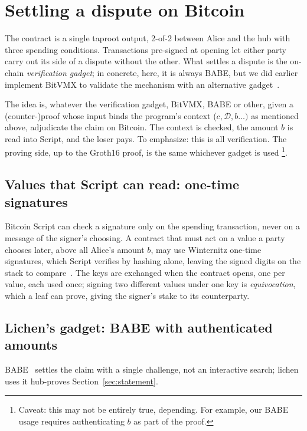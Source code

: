 \documentclass[11pt]{article}
\begin{document}
\section{Settling a dispute on Bitcoin}
\label{sec:blocks}

The contract is a single taproot output, 2-of-2 between Alice and the
hub with three spending conditions. Transactions pre-signed at
opening let either party carry out its side of a dispute without the
other. What settles a dispute is the on-chain \emph{verification gadget}; in concrete, here, it is always BABE, but we did earlier implement BitVMX to validate the mechanism with an alternative gadget~\cite{lichenbitvmx}.

The idea is, whatever the verification gadget, BitVMX, BABE or other, given a (counter-)proof whose input binds the
program's context ($c , \mathcal{D}, b \ldots )$ as mentioned above, adjudicate the
claim on Bitcoin. The context is checked, the amount $b$ is read into Script, and the loser pays. To emphasize: this is all verification. The proving side, up to the Groth16 proof, is the same whichever gadget is used \footnote{Caveat: this may not be entirely true, depending. For example, our BABE usage requires authenticating $b$ as part of the proof.}.

\subsection{Values that Script can read: one-time signatures}

Bitcoin Script can check a signature only on the spending transaction,
never on a message of the signer's choosing. A contract that must act on
a value a party chooses later, above all Alice's amount $b$, may use Winternitz
one-time signatures, which Script verifies by hashing alone, leaving the
signed digits on the stack to compare~\cite{bitvm,bitvmx}. The keys are
exchanged when the contract opens, one per value, each used once;
signing two different values under one key is \emph{equivocation},
which a leaf can prove, giving the signer's stake to its counterparty.

\subsection{Lichen's gadget: BABE with authenticated amounts}

BABE~\cite{babe} settles the claim with a single challenge, not an interactive search; lichen uses it hub-proves Section~\ref{sec:statement}.
\end{document}
